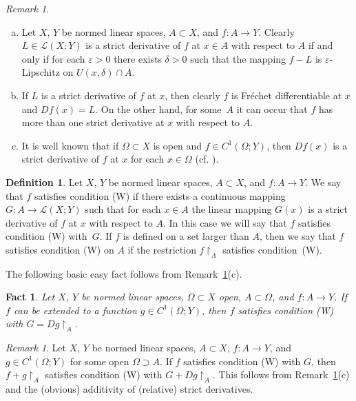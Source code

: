 \documentclass[a4paper,twoside,10pt,reqno,draft]{amsart}
\newtheorem{fact}[theorem]{Fact}
\theoremstyle{definition}
\newtheorem{definition}[theorem]{Definition}
\theoremstyle{remark}
\newtheorem{remark}[theorem]{Remark}
\newcommand\de{\delta}
\newcommand\ve{\varepsilon}
\newcommand\Om{\Omega}
\newcommand\restr[1]{\mathclose\restriction_{#1}}
\newcommand\lin[2]{\mathcal L(#1;#2)}
\newcommand\cW{(W)}
\begin{document}
\begin{remark}\label{r:strict_der}
\hfill
\begin{enumerate}[(a)]
\item
Let $X$, $Y$ be normed linear spaces, $A\subset X$, and $f\colon A\to Y$.
Clearly $L\in\lin XY$ is a strict derivative of $f$ at $x\in A$ with respect to $A$ if and only if for each $\ve>0$ there exists $\de>0$ such that the mapping $f-L$ is $\ve$-Lipschitz on $U(x,\de)\cap A$.
\item
If $L$ is a strict derivative of $f$ at $x$, then clearly $f$ is Fréchet differentiable at $x$ and $Df(x)=L$.
On the other hand, for some~$A$ it can occur that $f$ has more than one strict derivative at $x$ with respect to $A$.
\item
It is well known that if $\Om\subset X$ is open and $f\in C^1(\Om;Y)$, then $Df(x)$ is a strict derivative of $f$ at $x$ for each $x\in\Om$ (cf. \cite[p.~19]{Mo}).
\end{enumerate}
\end{remark}

\begin{definition}\label{d:condW}
Let $X$, $Y$ be normed linear spaces, $A\subset X$, and $f\colon A\to Y$.
We say that $f$ satisfies condition {\cW} if there exists a continuous mapping $G\colon A\to\lin XY$ such that for each $x\in A$ the linear mapping $G(x)$ is a strict derivative of $f$ at $x$ with respect to $A$.
In this case we will say that $f$ satisfies condition {\cW} with~$G$.
If $f$ is defined on a set larger than $A$, then we say that $f$ satisfies condition {\cW} on $A$ if the restriction $f\restr A$ satisfies condition~\cW.
\end{definition}

The following basic easy fact follows from Remark~\ref{r:strict_der}(c).
\begin{fact}\label{f:ext=>W}
Let $X$, $Y$ be normed linear spaces, $\Om\subset X$ open, $A\subset\Om$, and $f\colon A\to Y$.
If $f$ can be extended to a function $g\in C^1(\Om;Y)$, then $f$ satisfies condition {\cW} with $G=Dg\restr A$.
\end{fact}

\begin{remark}\label{r:condW-sum}
Let $X$, $Y$ be normed linear spaces, $A\subset X$, $f\colon A\to Y$, and $g\in C^1(\Om;Y)$ for some open $\Om\supset A$.
If $f$ satisfies condition {\cW} with $G$, then $f+g\restr A$ satisfies condition {\cW} with $G+Dg\restr A$.
This follows from Remark~\ref{r:strict_der}(c) and the (obvious) additivity of (relative) strict derivatives.
\end{remark}
\end{document}
